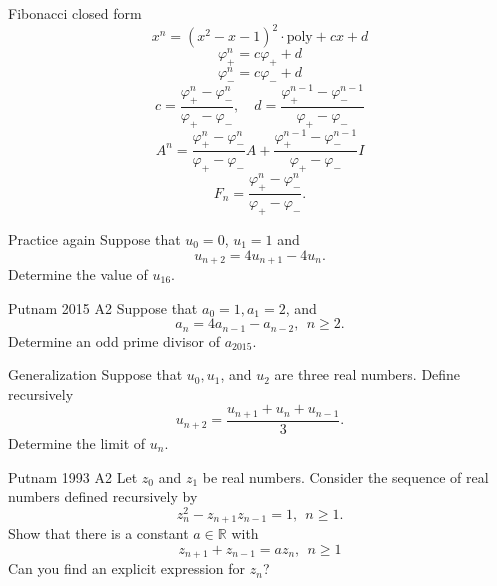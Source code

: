 \documentclass{beamer}
\begin{document}
\begin{frame}{Fibonacci closed form}
\pause
$$x^n = (x^2-x-1)^2\cdot\text{poly} + cx + d$$
\pause
$$\varphi_+^{n} =  c\varphi_+ + d$$
$$\varphi_-^{n} =  c\varphi_- + d$$
\pause
$$c = \frac{\varphi_+^{n}-\varphi_-^{n}}{\varphi_+-\varphi_-},\quad d = \frac{\varphi_+^{n-1}-\varphi_-^{n-1}}{\varphi_+-\varphi_-}$$
\pause
$$A^n = \frac{\varphi_+^{n}-\varphi_-^{n}}{\varphi_+-\varphi_-}A + \frac{\varphi_+^{n-1}-\varphi_-^{n-1}}{\varphi_+-\varphi_-}I$$
\pause
$$F_n = \frac{\varphi_+^n - \varphi_-^n}{\varphi_+-\varphi_-}.$$
\end{frame}

\begin{frame}{Practice again}
Suppose that $u_0 = 0$, $u_1 = 1$ and 
$$u_{n+2} = 4u_{n+1}-4u_n.$$
Determine the value of $u_{16}$.
\end{frame}

\begin{frame}{Putnam 2015 A2}
Suppose that $a_0 = 1, a_1 = 2$, and
$$a_{n} = 4a_{n-1}-a_{n-2},\ \ n\geq 2.$$
Determine an odd prime divisor of $a_{2015}$.
\end{frame}

\begin{frame}{Generalization}
Suppose that $u_0, u_1$, and $u_2$ are three real numbers.
Define recursively
$$u_{n+2} = \frac{u_{n+1}+u_n+u_{n-1}}{3}.$$
Determine the limit of $u_{n}$.
\end{frame}

\begin{frame}{Putnam 1993 A2}
Let $z_0$ and $z_1$ be real numbers.
Consider the sequence of real numbers defined recursively by
$$z_{n}^2-z_{n+1}z_{n-1} = 1,\ \ n \geq 1.$$
Show that there is a constant $a\in \mathbb R$ with
$$z_{n+1} + z_{n-1} = az_n,\ \ n\geq 1$$
Can you find an explicit expression for $z_n$?
\end{frame}
\end{document}
